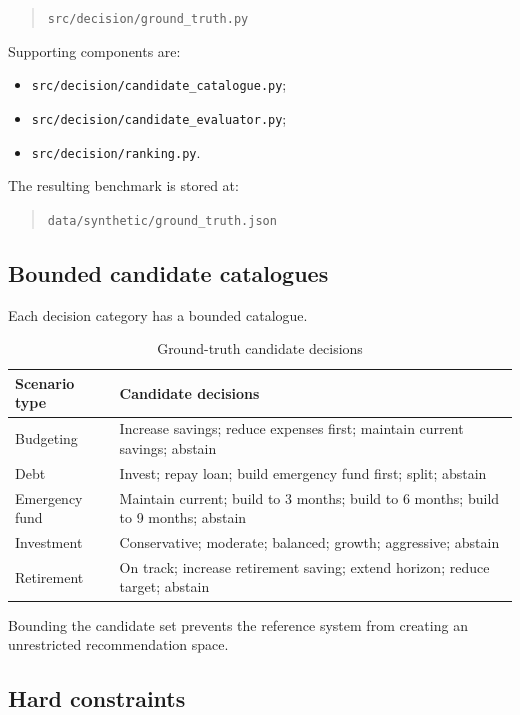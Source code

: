 \documentclass[12pt,a4paper]{article}
\begin{document}
\begin{quote}
\texttt{src/decision/ground\_truth.py}
\end{quote}

Supporting components are:
\begin{itemize}
    \item \texttt{src/decision/candidate\_catalogue.py};
    \item \texttt{src/decision/candidate\_evaluator.py};
    \item \texttt{src/decision/ranking.py}.
\end{itemize}

The resulting benchmark is stored at:

\begin{quote}
\texttt{data/synthetic/ground\_truth.json}
\end{quote}

\subsection{Bounded candidate catalogues}

Each decision category has a bounded catalogue.

\begin{table}[H]
\centering
\caption{Ground-truth candidate decisions}
\label{tab:catalogues}
\begin{tabular}{p{}p{}}
\toprule
Scenario type & Candidate decisions\\
\midrule
Budgeting & Increase savings; reduce expenses first; maintain current savings; abstain\\
Debt & Invest; repay loan; build emergency fund first; split; abstain\\
Emergency fund & Maintain current; build to 3 months; build to 6 months; build to 9 months; abstain\\
Investment & Conservative; moderate; balanced; growth; aggressive; abstain\\
Retirement & On track; increase retirement saving; extend horizon; reduce target; abstain\\
\bottomrule
\end{tabular}
\end{table}

Bounding the candidate set prevents the reference system from creating an unrestricted recommendation space.

\subsection{Hard constraints}
\end{document}
